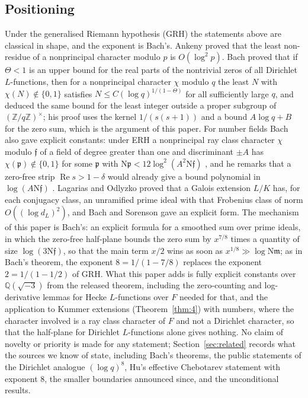 \documentclass[11pt]{article}
\theoremstyle{definition}
\theoremstyle{remark}
\numberwithin{equation}{section}
\newcommand{\Q}{\mathbb Q}
\newcommand{\Z}{\mathbb Z}
\newcommand{\fp}{\mathfrak p}
\newcommand{\fm}{\mathfrak m}
\newcommand{\ff}{\mathfrak f}
\newcommand{\Nm}{\mathrm N}
\newcommand{\Rea}{\operatorname{Re}}
\begin{document}
\subsection*{Positioning}
Under the generalised Riemann hypothesis (GRH) the statements above are classical in shape, and the exponent is Bach's. Ankeny \cite{ankeny1952} proved that the least non-residue of a nonprincipal character modulo $p$ is $O(\log^2p)$. Bach \cite{bach1982} proved that if $\Theta<1$ is an upper bound for the real parts of the nontrivial zeros of all Dirichlet $L$-functions, then for a nonprincipal character $\chi$ modulo $q$ the least $N$ with $\chi(N)\notin\{0,1\}$ satisfies $N\le C(\log q)^{1/(1-\Theta)}$ for all sufficiently large $q$, and deduced the same bound for the least integer outside a proper subgroup of $(\Z/q\Z)^\times$; his proof uses the kernel $1/(s(s+1))$ and a bound $A\log q+B$ for the zero sum, which is the argument of this paper. For number fields Bach also gave explicit constants: under ERH a nonprincipal ray class character $\chi$ modulo $\ff$ of a field of degree greater than one and discriminant $\pm A$ has $\chi(\fp)\notin\{0,1\}$ for some $\fp$ with $\Nm\fp<12\log^2(A^2\Nm\ff)$ \cite[Theorem~4]{bach1990}, and he remarks that a zero-free strip $\Rea s>1-\delta$ would already give a bound polynomial in $\log(A\Nm\ff)$ \cite[p.~365]{bach1990}. Lagarias and Odlyzko \cite{lo1977} proved that a Galois extension $L/K$ has, for each conjugacy class, an unramified prime ideal with that Frobenius class of norm $O((\log d_L)^2)$, and Bach and Sorenson \cite{bs1996} gave an explicit form. The mechanism of this paper is Bach's: an explicit formula for a smoothed sum over prime ideals, in which the zero-free half-plane bounds the zero sum by $x^{7/8}$ times a quantity of size $\log(3\Nm\ff)$, so that the main term $x/2$ wins as soon as $x^{1/8}\gg\log\Nm\fm$; as in Bach's theorem, the exponent $8=1/(1-7/8)$ replaces the exponent $2=1/(1-1/2)$ of GRH. What this paper adds is fully explicit constants over $\Q(\sqrt{-3})$ from the released theorem, including the zero-counting and log-derivative lemmas for Hecke $L$-functions over $F$ needed for that, and the application to Kummer extensions (Theorem~\ref{thm:4}) with numbers, where the character involved is a ray class character of $F$ and not a Dirichlet character, so that the half-plane for Dirichlet $L$-functions alone gives nothing. No claim of novelty or priority is made for any statement; Section~\ref{sec:related} records what the sources we know of state, including Bach's theorems, the public statements of the Dirichlet analogue $(\log q)^8$, Hu's effective Chebotarev statement with exponent $8$, the smaller boundaries announced since, and the unconditional results.
\end{document}
